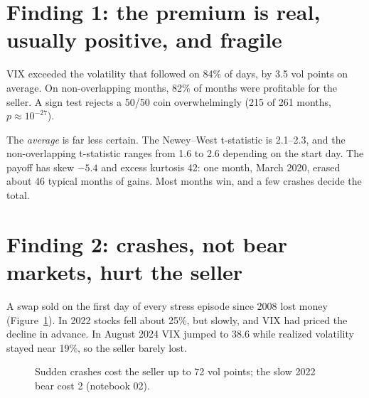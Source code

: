 \documentclass[10pt]{article}
\begin{document}
\section*{Finding 1: the premium is real, usually positive, and fragile}
VIX exceeded the volatility that followed on 84\% of days, by 3.5 vol points on average. On non-overlapping months, 82\% of months were profitable for the seller. A sign test rejects a 50/50 coin overwhelmingly (215 of 261 months, $p \approx 10^{-27}$).

The \emph{average} is far less certain. The Newey--West t-statistic is 2.1--2.3, and the non-overlapping t-statistic ranges from 1.6 to 2.6 depending on the start day. The payoff has skew $-5.4$ and excess kurtosis 42: one month, March 2020, erased about 46 typical months of gains. Most months win, and a few crashes decide the total.

\section*{Finding 2: crashes, not bear markets, hurt the seller}
A swap sold on the first day of every stress episode since 2008 lost money (Figure~\ref{fig:episodes}). In 2022 stocks fell about 25\%, but slowly, and VIX had priced the decline in advance. In August 2024 VIX jumped to 38.6 while realized volatility stayed near 19\%, so the seller barely lost.

\begin{figure}[!ht]
\centering
{}
\caption{Sudden crashes cost the seller up to 72 vol points; the slow 2022 bear cost 2 (notebook 02).}
\label{fig:episodes}
\end{figure}
\end{document}
